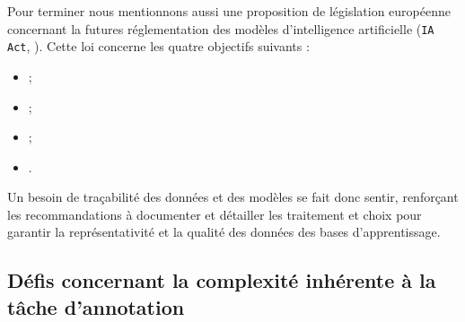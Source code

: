 			\begin{leftBarInformation}
				Pour terminer nous mentionnons aussi une proposition de législation européenne concernant la futures réglementation des modèles d'intelligence artificielle (\texttt{IA Act}, \cite{european-commission:2021:proposal-regulation-european}).
				Cette loi concerne les quatre objectifs suivants :
				\begin{itemize}
					\item {} ;
					\item {} ;
					\item {} ;
					\item {}.
				\end{itemize}
				Un besoin de traçabilité des données et des modèles se fait donc sentir, renforçant les recommandations à documenter et détailler les traitement et choix pour garantir la représentativité et la qualité des données des bases d'apprentissage.
			\end{leftBarInformation}
		
		
	\subsection{Défis concernant la complexité inhérente à la tâche d'annotation}
	\label{section:2.3.2-DEFIS-ANNOTATION-ASPECT-COMPLEXITE}
	
